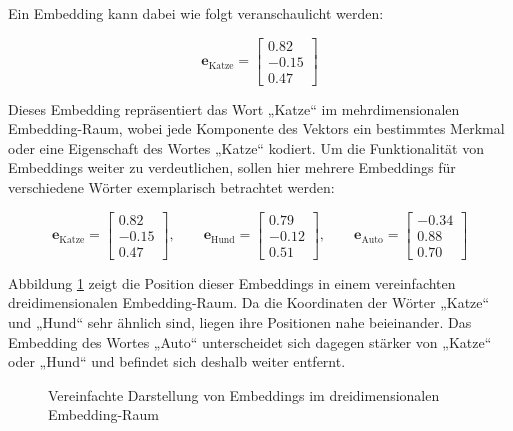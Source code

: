 Ein Embedding kann dabei wie folgt veranschaulicht werden:

\[ \mathbf{e}_{\text{Katze}} = \begin{bmatrix} 0.82 \\ -0.15 \\ 0.47 \end{bmatrix} \]

Dieses Embedding repräsentiert das Wort „Katze“ im mehrdimensionalen Embedding-Raum, wobei jede Komponente des Vektors ein bestimmtes Merkmal oder eine Eigenschaft des Wortes „Katze“ kodiert.
Um die Funktionalität von Embeddings weiter zu verdeutlichen, sollen hier mehrere Embeddings für verschiedene Wörter exemplarisch betrachtet werden:

\[ 
\mathbf{e}_{\text{Katze}} 
= 
\begin{bmatrix} 
  0.82\\ 
  -0.15\\ 
  0.47 
\end{bmatrix}, 
\qquad 
\mathbf{e}_{\text{Hund}} 
= 
\begin{bmatrix} 
  0.79\\ 
  -0.12\\ 
  0.51 
\end{bmatrix}, 
\qquad 
\mathbf{e}_{\text{Auto}} 
= 
\begin{bmatrix} 
  -0.34\\ 
  0.88\\ 
  0.70 
\end{bmatrix} 
\]

Abbildung \ref{fig:embedding3d} zeigt die Position dieser Embeddings in einem vereinfachten dreidimensionalen Embedding-Raum. 
Da die Koordinaten der Wörter „Katze“ und „Hund“ sehr ähnlich sind, liegen ihre Positionen nahe beieinander. 
Das Embedding des Wortes „Auto“ unterscheidet sich dagegen stärker von „Katze“ oder „Hund“ und befindet sich deshalb weiter entfernt. 

\begin{figure}[H] 
  \centering 
  \caption{Vereinfachte Darstellung von Embeddings im dreidimensionalen Embedding-Raum} 
  \label{fig:embedding3d} 
\end{figure}

